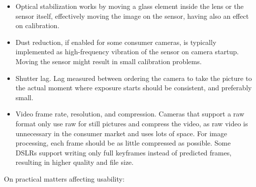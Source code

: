 \begin{itemize}
	\item Optical stabilization works by moving a glass element inside the lens or the sensor itself, effectively moving the image on the sensor, having also an effect on calibration.

	\item Dust reduction, if enabled for some consumer cameras, is typically implemented as high-frequency vibration of the sensor on camera startup. Moving the sensor might result in small calibration problems.

	\item Shutter lag. Lag measured between ordering the camera to take the picture to the actual moment where exposure starts should be consistent, and preferably small.

	\item Video frame rate, resolution, and compression. Cameras that support a raw format only use raw for still pictures and compress the video, as raw video is unnecessary in the consumer market and uses lots of space. For image processing, each frame should be as little compressed as possible. Some DSLRs support writing only full keyframes instead of predicted frames, resulting in higher quality and file size.

\end{itemize}

On practical matters affecting usability:

